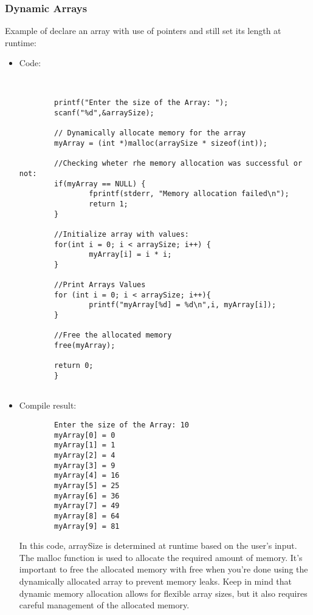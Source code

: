\documentclass{book}
\begin{document}
      \subsubsection{Dynamic Arrays}
      Example of declare an array with use of pointers and still set its length at runtime:
      \begin{itemize}
      \item Code:
      \begin{lstlisting}
        
        
        printf("Enter the size of the Array: ");
        scanf("%d",&arraySize);

        // Dynamically allocate memory for the array
        myArray = (int *)malloc(arraySize * sizeof(int));

        //Checking wheter rhe memory allocation was successful or not:
        if(myArray == NULL) {
                fprintf(stderr, "Memory allocation failed\n");
                return 1;
        }

        //Initialize array with values:
        for(int i = 0; i < arraySize; i++) {
                myArray[i] = i * i;
        }

        //Print Arrays Values
        for (int i = 0; i < arraySize; i++){
                printf("myArray[%d] = %d\n",i, myArray[i]);
        }

        //Free the allocated memory
        free(myArray);

        return 0;
        }
    
      \end{lstlisting}
      \item Compile result:
      \begin{lstlisting}
        Enter the size of the Array: 10
        myArray[0] = 0
        myArray[1] = 1
        myArray[2] = 4
        myArray[3] = 9
        myArray[4] = 16
        myArray[5] = 25
        myArray[6] = 36
        myArray[7] = 49
        myArray[8] = 64
        myArray[9] = 81
      \end{lstlisting}
      In this code, arraySize is determined at runtime based on the user’s input. The malloc function is used to allocate the required amount of memory. It’s important to free the allocated memory with free when you’re done using the dynamically allocated array to prevent memory leaks.
      Keep in mind that dynamic memory allocation allows for flexible array sizes, but it also requires careful management of the allocated memory.




\end{itemize}
\end{document}

